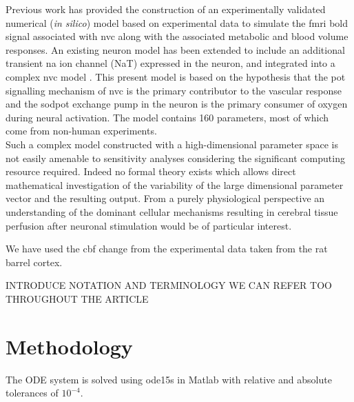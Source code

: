 \documentclass[12pt]{article}
\numberwithin{equation}{section}
\begin{document}
Previous work \cite{Mathias2018} has provided  the construction of an experimentally validated numerical (\textit{in silico}) model based on experimental data to simulate the \gls{fmri} \gls{bold} signal associated with \gls{nvc} along with the associated metabolic and blood volume responses. An existing neuron model \citep{Mathias2017, Mathias2017a} has been extended to include an additional transient \gls{na} ion channel (NaT) expressed in the neuron, and integrated into a complex \gls{nvc} model \citep{Dormanns2015, Dormanns2016, Kenny2017a}. This present model is based on the hypothesis that the \gls{pot} signalling mechanism of \gls{nvc} is the primary contributor to the vascular response and the \gls{sodpot} exchange pump in the neuron is the primary consumer of oxygen during neural activation. The model contains 160 parameters, most of which come from non-human experiments. \\
Such a complex model constructed with a high-dimensional parameter space is not easily amenable to sensitivity analyses considering the significant computing resource required. Indeed no formal theory exists which allows direct mathematical investigation of the variability of the large dimensional parameter vector and the resulting output. 
From a purely physiological perspective an understanding of the dominant cellular mechanisms resulting in cerebral tissue perfusion after neuronal stimulation would be of particular interest.
  
  We have used the \gls{cbf} change from the experimental data \cite{Zheng2010} taken from the rat barrel cortex. 
  
 INTRODUCE NOTATION AND TERMINOLOGY WE CAN REFER TOO THROUGHOUT THE ARTICLE
  
\section{Methodology}
The ODE system is solved using ode15s in Matlab with relative and absolute tolerances of $10^{-4}$.
\end{document}
